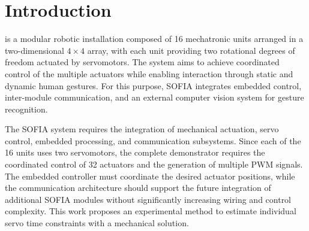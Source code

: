 \documentclass[lettersize,journal]{IEEEtran}
\begin{document}
	
	\section{Introduction}
	
	 is a modular robotic installation composed of 16
	mechatronic units arranged in a two-dimensional $4 \times 4$ array, with each
	unit providing two rotational degrees of freedom actuated by servomotors. The
	system aims to achieve coordinated control of the multiple actuators while
	enabling interaction through static and dynamic human gestures. For this
	purpose, SOFIA integrates embedded control, inter-module communication, and an
	external computer vision system for gesture recognition.
	
	The SOFIA system requires the
	integration of mechanical actuation, servo control, embedded processing, and
	communication subsystems. Since each of the 16 units uses two servomotors, the
	complete demonstrator requires the coordinated control of 32 actuators and the
	generation of multiple PWM signals. The embedded controller must coordinate
	the desired actuator positions, while the communication architecture should
	support the future integration of additional SOFIA modules without
	significantly increasing wiring and control complexity. This work proposes an experimental method to estimate individual servo time constraints with a mechanical solution.
	
\end{document}

